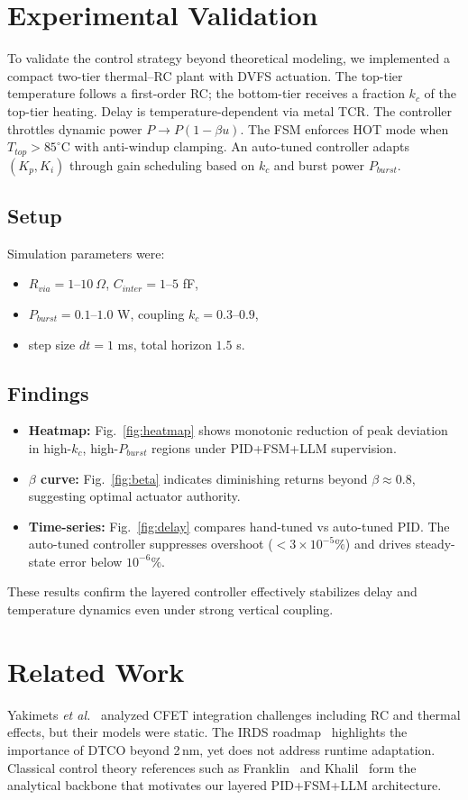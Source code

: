 \documentclass[conference]{IEEEtran}
\begin{document}
\section{Experimental Validation}
To validate the control strategy beyond theoretical modeling,
we implemented a compact two-tier thermal–RC plant with DVFS actuation. 
The top-tier temperature follows a first-order RC; 
the bottom-tier receives a fraction $k_c$ of the top-tier heating. 
Delay is temperature-dependent via metal TCR. 
The controller throttles dynamic power $P \to P(1-\beta u)$. 
The FSM enforces HOT mode when $T_{top}>85^\circ$C with anti-windup clamping. 
An auto-tuned controller adapts $(K_p,K_i)$ through gain scheduling 
based on $k_c$ and burst power $P_{burst}$.

\subsection{Setup}
Simulation parameters were:
\begin{itemize}
  \item $R_{via}=1\text{--}10~\Omega$, $C_{inter}=1\text{--}5$ fF,
  \item $P_{burst}=0.1\text{--}1.0$ W, coupling $k_c=0.3\text{--}0.9$,
  \item step size $dt=1$ ms, total horizon $1.5$ s.
\end{itemize}

\subsection{Findings}
\begin{itemize}
  \item \textbf{Heatmap:} Fig.~\ref{fig:heatmap} shows 
  monotonic reduction of peak deviation in high-$k_c$, high-$P_{burst}$ regions 
  under PID+FSM+LLM supervision.
  \item \textbf{$\beta$ curve:} Fig.~\ref{fig:beta} indicates diminishing returns 
  beyond $\beta \approx 0.8$, suggesting optimal actuator authority.
  \item \textbf{Time-series:} Fig.~\ref{fig:delay} compares hand-tuned vs auto-tuned PID. 
  The auto-tuned controller suppresses overshoot ($<3\times 10^{-5}\%$) 
  and drives steady-state error below $10^{-6}\%$.
\end{itemize}
These results confirm the layered controller effectively stabilizes 
delay and temperature dynamics even under strong vertical coupling.

\section{Related Work}
Yakimets \textit{et al.}~\cite{yakimets2020cfet} analyzed CFET
integration challenges including RC and thermal effects,
but their models were static.
The IRDS roadmap~\cite{irds2023} highlights the importance of DTCO
beyond 2\,nm, yet does not address runtime adaptation.
Classical control theory references such as Franklin~\cite{franklin2015}
and Khalil~\cite{khalil2002} form the analytical backbone
that motivates our layered PID+FSM+LLM architecture.
\end{document}
